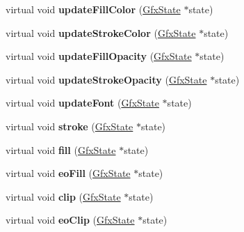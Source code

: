 \begin{DoxyCompactItemize}
virtual void {\bfseries update\+Fill\+Color} (\hyperlink{class_gfx_state}{Gfx\+State} $\ast$state)
\item 
\mbox{\label{class_arthur_output_dev_ae63b74e87812e48d6c9ad224a0920071}} 
virtual void {\bfseries update\+Stroke\+Color} (\hyperlink{class_gfx_state}{Gfx\+State} $\ast$state)
\item 
\mbox{\label{class_arthur_output_dev_a425bc18a31566dd0c2ca5de158b5a990}} 
virtual void {\bfseries update\+Fill\+Opacity} (\hyperlink{class_gfx_state}{Gfx\+State} $\ast$state)
\item 
\mbox{\label{class_arthur_output_dev_a99991401269bad463f5141be44432ab7}} 
virtual void {\bfseries update\+Stroke\+Opacity} (\hyperlink{class_gfx_state}{Gfx\+State} $\ast$state)
\item 
\mbox{\label{class_arthur_output_dev_a94b7937060ee341e64af134bc14348f4}} 
virtual void {\bfseries update\+Font} (\hyperlink{class_gfx_state}{Gfx\+State} $\ast$state)
\item 
\mbox{\label{class_arthur_output_dev_af427b4bad695762d94aac09f77292fc1}} 
virtual void {\bfseries stroke} (\hyperlink{class_gfx_state}{Gfx\+State} $\ast$state)
\item 
\mbox{\label{class_arthur_output_dev_ab41aa5e79659fc19702c39bf54b417bd}} 
virtual void {\bfseries fill} (\hyperlink{class_gfx_state}{Gfx\+State} $\ast$state)
\item 
\mbox{\label{class_arthur_output_dev_a59145d52b68163b40561cea12599b98e}} 
virtual void {\bfseries eo\+Fill} (\hyperlink{class_gfx_state}{Gfx\+State} $\ast$state)
\item 
\mbox{\label{class_arthur_output_dev_aa2175565a57dc74933d8b153fd84c762}} 
virtual void {\bfseries clip} (\hyperlink{class_gfx_state}{Gfx\+State} $\ast$state)
\item 
\mbox{\label{class_arthur_output_dev_aca4d2c648afc703d0d3407d199cad5f5}} 
virtual void {\bfseries eo\+Clip} (\hyperlink{class_gfx_state}{Gfx\+State} $\ast$state)

\end{DoxyCompactItemize}
